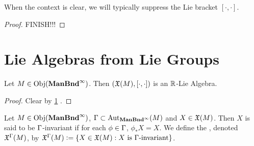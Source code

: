 \documentclass{book}
\begin{document}
\begin{note}
	When the context is clear, we will typically suppress the Lie bracket $[\cdot, \cdot]$.
\end{note}

\begin{ex}
\end{ex}

\begin{proof}
	FINISH!!!
\end{proof}










































\section{Lie Algebras from Lie Groups}

\begin{ex}
	Let $M \in \operatorname{Obj}(\operatorname*{\text{\textbf{ManBnd}}^{\infty}})$. Then $(\mathfrak{X}(M), [\cdot, \cdot])$ is an $\mathbb{R}$-Lie Algebra.
\end{ex}

\begin{proof}
	Clear by \ref{} .
\end{proof}

\begin{defn}
	Let $M \in \operatorname{Obj}(\operatorname*{\text{\textbf{ManBnd}}^{\infty}})$, $\Gamma \subset \operatorname{Aut}_{\operatorname*{\text{\textbf{ManBnd}}^{\infty}}}(M)$ and $X \in \mathfrak{X}(M)$. Then $X$ is said to be $\Gamma$-invariant if for each $\phi \in \Gamma$, $\phi_*X = X$. We define the , denoted $\mathfrak{X}^{\Gamma}(M)$, by $\mathfrak{X}^{\Gamma}(M) \vcentcolon= \{X \in \mathfrak{X}(M): X \text{ is $\Gamma$-invariant}\}$.
\end{defn}
\end{document}
